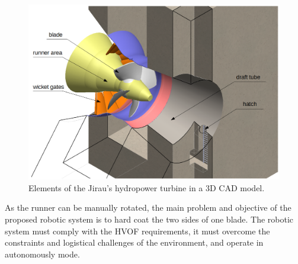 \begin{figure}[h!]
\centering
	\includegraphics[width=\columnwidth]{figs/problem/ambiente_3d.PNG} 
	\caption{Elements of the Jirau's hydropower turbine in a 3D CAD model.}
	\label{fig::ambiente3d}
\end{figure}


As the runner can be manually rotated, the main problem and objective of the
proposed robotic system is to hard coat the two sides of one blade. The
robotic system must comply with the HVOF requirements, it must overcome the
constraints and logistical challenges of the environment, and operate in
autonomously mode. 

